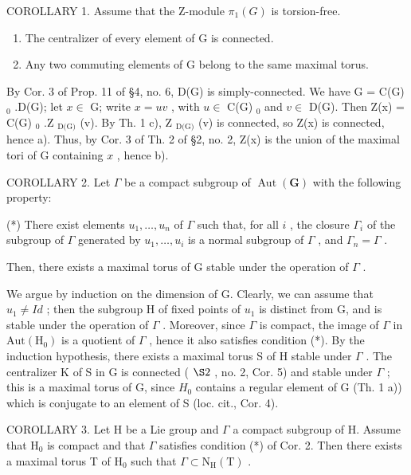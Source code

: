 COROLLARY 1. Assume that the Z-module \(\pi_{1}(G)\) is torsion-free.

\begin{enumerate}
\def\labelenumi{\alph{enumi})}
\item
  The centralizer of every element of G is connected.
\item
  Any two commuting elements of G belong to the same maximal torus.
\end{enumerate}

By Cor. 3 of Prop. 11 of §4, no. 6, D(G) is simply-connected. We have G = C(G) \(_0\) .D(G); let \(x \in\) G; write \(x = uv\) , with \(u \in\) C(G) \(_0\) and \(v \in\) D(G). Then Z(x) = C(G) \(_0\) .Z \(_{\text{D(G)}}\) (v). By Th. 1 c), Z \(_{\text{D(G)}}\) (v) is connected, so Z(x) is connected, hence a). Thus, by Cor. 3 of Th. 2 of §2, no. 2, Z(x) is the union of the maximal tori of G containing \(x\) , hence b).

COROLLARY 2. Let \(\Gamma\) be a compact subgroup of \(\operatorname{Aut}(\mathbf{G})\) with the following property:

(*) There exist elements \(u_{1}, \ldots, u_{n}\) of \(\Gamma\) such that, for all \(i\) , the closure \(\Gamma_{i}\) of the subgroup of \(\Gamma\) generated by \(u_{1}, \ldots, u_{i}\) is a normal subgroup of \(\Gamma\) , and \(\Gamma_{n} = \Gamma\) .

Then, there exists a maximal torus of G stable under the operation of \(\Gamma\) .

We argue by induction on the dimension of G. Clearly, we can assume that \(u_{1} \neq Id\) ; then the subgroup H of fixed points of \(u_{1}\) is distinct from G, and is stable under the operation of \(\varGamma\) . Moreover, since \(\varGamma\) is compact, the image of \(\varGamma\) in \(\mathrm{Aut}(\mathrm{H}_{0})\) is a quotient of \(\varGamma\) , hence it also satisfies condition (*). By the induction hypothesis, there exists a maximal torus S of H stable under \(\varGamma\) . The centralizer K of S in G is connected ( \(\S2\) , no. 2, Cor. 5) and stable under \(\varGamma\) ; this is a maximal torus of G, since \(H_{0}\) contains a regular element of G (Th. 1 a)) which is conjugate to an element of S (loc. cit., Cor. 4).

COROLLARY 3. Let H be a Lie group and \(\Gamma\) a compact subgroup of H. Assume that \(\mathrm{H}_0\) is compact and that \(\Gamma\) satisfies condition (*) of Cor. 2. Then there exists a maximal torus T of \(\mathrm{H}_0\) such that \(\Gamma \subset \mathrm{N}_{\mathrm{H}}(\mathrm{T})\) .

